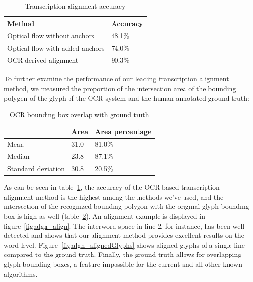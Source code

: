 
\begin{table}[h]
\centering
\caption{Transcription alignment accuracy}
\begin{tabularx}{.8\textwidth}{Xl} \toprule
\textbf{Method}& \textbf{Accuracy}\\\midrule
Optical flow without anchors&48.1\%\\
Optical flow with added anchors&74.0\%\\
OCR derived alignment & $\mathbf{90.3\%}$\\ \bottomrule
\end{tabularx}
\label{tab:algn_tab1}
\end{table}

To further examine the performance of our leading transcription alignment
method, we measured the proportion of the intersection area of the bounding
polygon of the glyph of the OCR system and the human annotated ground truth: 


\begin{table}[h!]
\centering
\caption{OCR bounding box overlap with ground truth}
\begin{tabularx}{0.8\textwidth}{Xll}
\toprule
& \textbf{Area} & \textbf{Area percentage}\\\midrule
Mean &31.0&81.0\%\\
Median &23.8&87.1\%\\ 
Standard deviation&30.8&20.5\%\\ \bottomrule
\end{tabularx} 
\label{tab:algn_tab2}
\end{table}

As can be seen in table~\ref{tab:algn_tab1}, the accuracy of the OCR based
transcription alignment method is the highest among the methods we've used, and
the intersection of the recognized bounding polygon with the original glyph
bounding box is high as well (table~\ref{tab:algn_tab2}). An alignment example
is displayed in figure~\ref{fig:algn_align}. The interword space in line 2, for
instance, has been well detected and shows that our alignment method provides
excellent results on the word level. Figure~\ref{fig:algn_alignedGlyphs} shows
aligned glyphs of a single line compared to the ground truth.  Finally, the
ground truth allows for overlapping glyph bounding boxes, a feature impossible
for the current and all other known algorithms.

